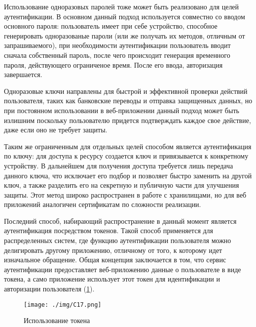 Использование одноразовых паролей тоже может быть реализовано для целей аутентификации. В основном данный подход используется совместно со вводом основного пароля: пользователь имеет при себе устройство, способное генерировать одноразованые пароли (или же получать их методов, отличным от запрашиваемого), при необходимости аутентификации пользователь вводит сначала собственный пароль, после чего происходит генерация временного пароля, действующего ограниченое время. После его ввода, авторизация завершается.

Одноразовые ключи направлены для быстрой и эффективной проверки действий пользователя, таких как банковские переводы и отправка защищенных данных, но при постоянном использовании в веб-приложении данный подход может быть излишним поскольку пользователю придется подтверждать каждое свое действие, даже если оно не требует защиты.

Таким же ограниченным для отдельных целей способом является аутентификация по ключу: для доступа к ресурсу создается ключ и привязывается к конкретному устройству. В дальнейшем для получения доступа требуется лишь передача данного ключа, что исключает его подбор и позволяет быстро заменить на другой ключ, а также разделить его на секретную и публичную части для улучшения защиты. Этот метод широко распространен в работе с хранилищами, но для веб приложений аналогичен сертификатам по сложности реализации.

Последний способ, набирающий распространение в данный момент является аутентификация посредством токенов. Такой способ применяется для распределенных систем, где функцию аутентификации пользователя можно делигировать другому приложению, отличному от того, к которому идет изначальное обращение. Общая концепция заключается в том, что сервис аутентификации предоставляет веб-приложению данные о пользователе в виде токена, а само приложение использует этот токен для идентификации и авторизации пользователя (\ref{pic:C17}).

\begin{figure}

\begin{center}

\texttt{[image: ./img/C17.png]}

\end{center}

\caption{Использование токена}

\label{pic:C17}

\end{figure}

